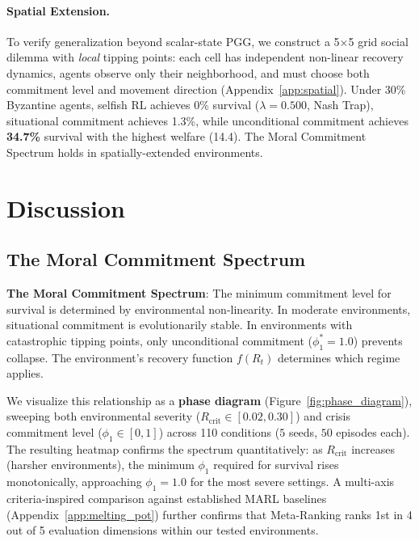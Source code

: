 \documentclass{article}
\begin{document}
\paragraph{Spatial Extension.}
To verify generalization beyond scalar-state PGG, we construct a 5$\times$5 grid social dilemma with \emph{local} tipping points: each cell has independent non-linear recovery dynamics, agents observe only their neighborhood, and must choose both commitment level and movement direction (Appendix~\ref{app:spatial}).
Under 30\% Byzantine agents, selfish RL achieves 0\% survival ($\lambda = 0.500$, Nash Trap), situational commitment achieves 1.3\%, while unconditional commitment achieves \textbf{34.7\%} survival with the highest welfare (14.4).
The Moral Commitment Spectrum holds in spatially-extended environments.

\section{Discussion}
\label{sec:discussion}

\subsection{The Moral Commitment Spectrum}

\textbf{The Moral Commitment Spectrum}: The minimum commitment level for survival is determined by environmental non-linearity.
In moderate environments, situational commitment is evolutionarily stable.
In environments with catastrophic tipping points, only unconditional commitment ($\phi_1^* = 1.0$) prevents collapse.
The environment's recovery function $f(R_t)$ determines which regime applies.

We visualize this relationship as a \textbf{phase diagram} (Figure~\ref{fig:phase_diagram}), sweeping both environmental severity ($R_{\text{crit}} \in [0.02, 0.30]$) and crisis commitment level ($\phi_1 \in [0, 1]$) across 110 conditions ($5$ seeds, $50$ episodes each).
The resulting heatmap confirms the spectrum quantitatively: as $R_{\text{crit}}$ increases (harsher environments), the minimum $\phi_1$ required for survival rises monotonically, approaching $\phi_1 = 1.0$ for the most severe settings.
A multi-axis criteria-inspired comparison against established MARL baselines (Appendix~\ref{app:melting_pot}) further confirms that Meta-Ranking ranks 1st in 4 out of 5 evaluation dimensions within our tested environments.
\end{document}
